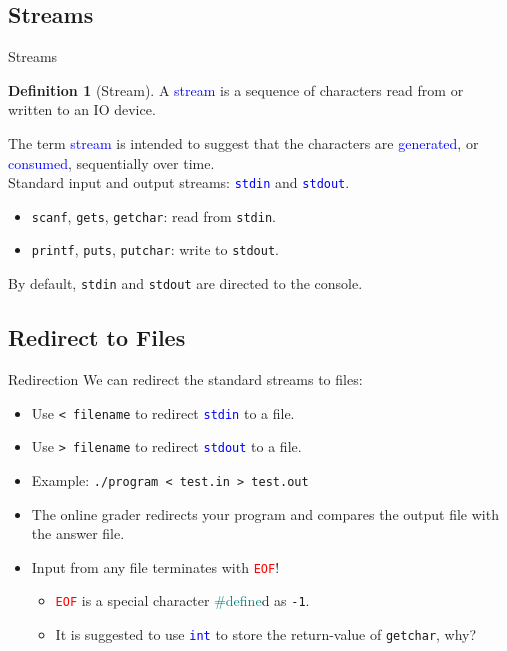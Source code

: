 \documentclass{beamer}
\newcommand{\red}[1]{\textcolor{red}{#1}}
\newcommand{\blue}[1]{\textcolor{blue}{#1}}
\newcommand{\teal}[1]{\textcolor{teal}{#1}}
\newcommand{\ttt}[1]{\texttt{#1}}
\newcommand{\bluett}[1]{\blue{\ttt{#1}}}
\newcommand{\redtt}[1]{\red{\ttt{#1}}}
\theoremstyle{definition}
\newtheorem{dfn}{Definition}
\begin{document}
\subsection{Streams}

\begin{frame}{Streams}
    \begin{dfn}[Stream]
        A \blue{stream} is a sequence of characters read from or written to an IO device.
    \end{dfn}
    The term \blue{stream} is intended to suggest that the characters are \blue{generated}, or \blue{consumed}, sequentially over time.\\
    \pause
    Standard input and output streams: \bluett{stdin} and \bluett{stdout}.
    \begin{itemize}
        \item \ttt{scanf}, \ttt{gets}, \ttt{getchar}: read from \ttt{stdin}.
        \item \ttt{printf}, \ttt{puts}, \ttt{putchar}: write to \ttt{stdout}.
    \end{itemize}
    By default, \ttt{stdin} and \ttt{stdout} are directed to the console.
\end{frame}

\subsection{Redirect to Files}

\begin{frame}{Redirection}
    We can redirect the standard streams to files:
    \begin{itemize}
        \item Use \ttt{< filename} to redirect \bluett{stdin} to a file.
        \item Use \ttt{> filename} to redirect \bluett{stdout} to a file.
        \pause
        \item Example: \ttt{./program < test.in > test.out}
        \item The online grader redirects your program and compares the output file with the answer file.
        \pause
        \item Input from any file terminates with \redtt{EOF}!
        \begin{itemize}
            \item \redtt{EOF} is a special character \teal{\#define}d as \ttt{-1}.
            \item It is suggested to use \bluett{int} to store the return-value of \ttt{getchar}, why?
        \end{itemize}
    \end{itemize}
\end{frame}
\end{document}
